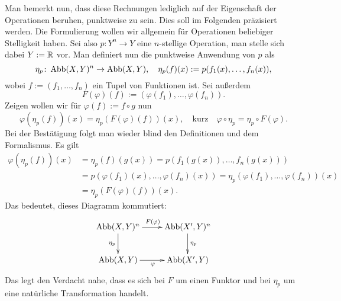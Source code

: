 Man bemerkt nun, dass diese Rechnungen lediglich auf der Eigenschaft
der Operationen beruhen, punktweise zu sein. Dies soll im Folgenden
präzisiert werden. Die Formulierung wollen wir allgemein für
Operationen beliebiger Stelligkeit haben. Sei also $p\colon Y^n\to Y$
eine $n$-stellige Operation, man stelle sich dabei $Y:=\mathbb R$ vor. Man
definiert nun die punktweise Anwendung von $p$ als%
\begin{equation}\label{eq:eta-punktweise}
\eta_p\colon\operatorname{Abb}(X,Y)^n\to\operatorname{Abb}(X,Y),\quad
\eta_p(f)(x) := p(f_1(x),\ldots,f_n(x)),
\end{equation}
wobei $f:=(f_1,\ldots,f_n)$ ein Tupel von Funktionen ist. Sei außerdem%
\begin{equation}
F(\varphi)(f) := (\varphi(f_1),\ldots,\varphi(f_n)).
\end{equation}
Zeigen wollen wir für $\varphi(f):=f\circ g$ nun
\begin{equation}
\varphi(\eta_p(f))(x) = \eta_p(F(\varphi)(f))(x),
\quad\text{kurz}\quad
\varphi\circ\eta_p = \eta_p\circ F(\varphi).
\end{equation}
Bei der Bestätigung folgt man wieder blind den Definitionen und dem
Formalismus. Es gilt%
\begin{align}
\varphi(\eta_p(f))(x)
&= \eta_p(f)(g(x)) = p(f_1(g(x)),\ldots,f_n(g(x)))\\
&= p(\varphi(f_1)(x),\ldots,\varphi(f_n)(x))
= \eta_p(\varphi(f_1),\ldots,\varphi(f_n))(x)\\
&= \label{eq:Ende-eta-punktweise}\eta_p(F(\varphi)(f))(x).
\end{align}
Das bedeutet, dieses Diagramm kommutiert:
\[\xymatrix{
\Abb(X,Y)^n \ar[r]^{F(\varphi)} \ar[d]_{\eta_p}
& \Abb(X',Y)^n \ar[d]^{\eta_p} \\
\Abb(X,Y) \ar[r]_{\varphi} & \Abb(X',Y)}\]
Das legt den Verdacht nahe, dass es sich bei $F$ um einen Funktor
und bei $\eta_p$ um eine natürliche Transformation handelt.


